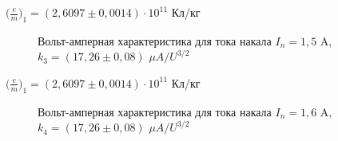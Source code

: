 \documentclass[a4paper,12pt]{article}
\begin{document}
\par $\big(\frac{e}{m}\big)_1 = (2,6097 \pm 0,0014) \cdot 10^{11}$ Кл/кг

\begin{figure} 
	\centering
	\caption{Вольт-амперная характеристика для тока накала $I_n = 1,5$ A, $k_3 = (17,26 \pm 0,08)$ $\mu A/U^{3/2}$}
	\label{mah}
\end{figure}

\par $\big(\frac{e}{m}\big)_1 = (2,6097 \pm 0,0014) \cdot 10^{11}$ Кл/кг

\begin{figure} 
	\centering
	\caption{Вольт-амперная характеристика для тока накала $I_n = 1,6$ A, $k_4 = (17,26 \pm 0,08)$ $\mu A/U^{3/2}$}
	\label{mah}
\end{figure}
\end{document}
